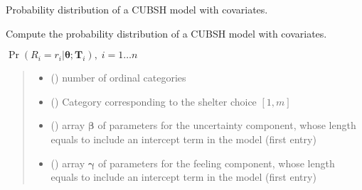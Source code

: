\documentclass[letterpaper,10pt,english]{sphinxmanual}
\begin{document}
\begin{fulllineitems}
\label{\detokenize{cubmods:cubmods.cubsh_ywx.prob}}
\pysigstartsignatures
{}
\pysigstopsignatures
\sphinxAtStartPar
Probability distribution of a CUBSH model with covariates.

\sphinxAtStartPar
Compute the probability distribution of a CUBSH model with covariates.

\sphinxAtStartPar
\(\Pr(R_i=r_i|\pmb\theta;\pmb T_i),\; i=1 \ldots n\)
\begin{quote}\begin{description}
\begin{itemize}
\item {} 
\sphinxAtStartPar
{} () \textendash{} number of ordinal categories

\item {} 
\sphinxAtStartPar
{} () \textendash{} Category corresponding to the shelter choice \([1,m]\)

\item {} 
\sphinxAtStartPar
{} () \textendash{} array \(\pmb \beta\) of parameters for the uncertainty component, whose length equals 
 to include an intercept term in the model (first entry)

\item {} 
\sphinxAtStartPar
{} () \textendash{} array \(\pmb \gamma\) of parameters for the feeling component, whose length equals 
 to include an intercept term in the model (first entry)


\end{itemize}
\end{description}
\end{quote}
\end{fulllineitems}
\end{document}
